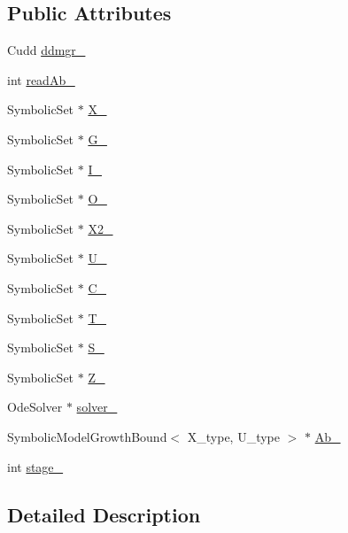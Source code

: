 \subsection*{Public Attributes}
\begin{DoxyCompactItemize}
\item 
Cudd \hyperlink{classscots_1_1Compare_a330d650aa232026ba22f43aa81974af9}{ddmgr\+\_\+}
\item 
int \hyperlink{classscots_1_1Compare_ad18456a4cc253ae0d300cda74517e64b}{read\+Ab\+\_\+}
\item 
Symbolic\+Set $\ast$ \hyperlink{classscots_1_1Compare_a4d0bb95aefd7ffeda946bd79a8170825}{X\+\_\+}
\item 
Symbolic\+Set $\ast$ \hyperlink{classscots_1_1Compare_a1a7d912c19ff01269353ec705a257ad6}{G\+\_\+}
\item 
Symbolic\+Set $\ast$ \hyperlink{classscots_1_1Compare_a32b383c4e137a371859fdee22c165486}{I\+\_\+}
\item 
Symbolic\+Set $\ast$ \hyperlink{classscots_1_1Compare_a5dd50527db402893630c209d05be4ef0}{O\+\_\+}
\item 
Symbolic\+Set $\ast$ \hyperlink{classscots_1_1Compare_a3f1ba24992e2dfe24358087aeecb5a75}{X2\+\_\+}
\item 
Symbolic\+Set $\ast$ \hyperlink{classscots_1_1Compare_ac341e6c2534e4bb4ab248cc767c33b8d}{U\+\_\+}
\item 
Symbolic\+Set $\ast$ \hyperlink{classscots_1_1Compare_a1ffd2853abc9ab09cfb8983b3664ab1b}{C\+\_\+}
\item 
Symbolic\+Set $\ast$ \hyperlink{classscots_1_1Compare_aeb0830d94286ae12672cf1ea183afb1d}{T\+\_\+}
\item 
Symbolic\+Set $\ast$ \hyperlink{classscots_1_1Compare_a2512f264f83a21365693bbd506b9e7a2}{S\+\_\+}
\item 
Symbolic\+Set $\ast$ \hyperlink{classscots_1_1Compare_ae1a8d5e076e059cda7124581dc3d05ab}{Z\+\_\+}
\item 
Ode\+Solver $\ast$ \hyperlink{classscots_1_1Compare_aa42864e8794631891d01f0367e1db277}{solver\+\_\+}
\item 
Symbolic\+Model\+Growth\+Bound$<$ X\+\_\+type, U\+\_\+type $>$ $\ast$ \hyperlink{classscots_1_1Compare_a0ec2c4c168dc46f79616a393c1cda103}{Ab\+\_\+}
\item 
int \hyperlink{classscots_1_1Compare_ae036e8066fed2391f333c8f64282f12e}{stage\+\_\+}
\end{DoxyCompactItemize}


\subsection{Detailed Description}
